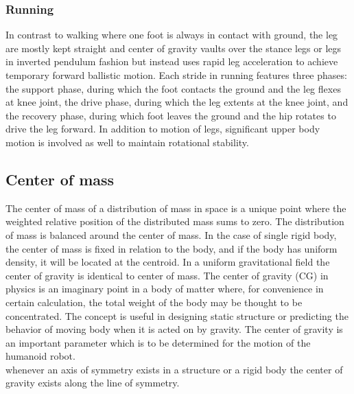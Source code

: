 \documentclass[12pt]{article}
\begin{document}
\subsubsection{Running}
In contrast to walking where one foot is always in contact with ground, the leg are mostly kept straight and center of gravity vaults over the stance legs or legs in inverted pendulum fashion but instead uses rapid leg acceleration to achieve temporary forward ballistic motion. Each stride in running features three phases: the support phase, during which the foot contacts the ground and the leg flexes at knee joint, the drive phase, during which the leg extents at the knee joint, and the recovery phase, during which foot leaves the ground and the hip rotates to drive the leg forward. In addition to motion of legs, significant upper body motion is involved as well to maintain rotational stability.
\newpage
\subsection{Center of mass}
The center of mass of a distribution of mass in space is a unique point where the weighted relative position of the distributed mass sums to zero. The distribution of mass is balanced around the center of mass. In the case of single rigid body, the center of mass is fixed in relation to the body, and if the body has uniform density, it will be located at the centroid. In a uniform gravitational field the center of gravity is identical to center of mass.  The center of gravity (CG) in physics is an imaginary point in a body of matter where, for convenience in certain calculation, the total weight of the body may be thought to be concentrated. The concept is useful in designing static structure or predicting the behavior of moving body when it is acted on by gravity. The center of gravity is an important parameter which is to be determined for the motion of the humanoid robot.\\

whenever an axis of symmetry exists in a structure or a rigid body the center of gravity exists along the line of symmetry.  
\\
\end{document}
